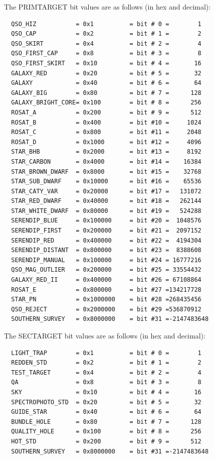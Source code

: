\documentclass[12pt,preprint]{aastex}
\begin{document}
The PRIMTARGET bit values are as follows (in hex and decimal):
\begin{verbatim}
  QSO_HIZ           = 0x1          = bit # 0 =        1
  QSO_CAP           = 0x2          = bit # 1 =        2
  QSO_SKIRT         = 0x4          = bit # 2 =        4
  QSO_FIRST_CAP     = 0x8          = bit # 3 =        8
  QSO_FIRST_SKIRT   = 0x10         = bit # 4 =       16
  GALAXY_RED        = 0x20         = bit # 5 =       32
  GALAXY            = 0x40         = bit # 6 =       64
  GALAXY_BIG        = 0x80         = bit # 7 =      128
  GALAXY_BRIGHT_CORE= 0x100        = bit # 8 =      256
  ROSAT_A           = 0x200        = bit # 9 =      512
  ROSAT_B           = 0x400        = bit #10 =     1024
  ROSAT_C           = 0x800        = bit #11 =     2048
  ROSAT_D           = 0x1000       = bit #12 =     4096
  STAR_BHB          = 0x2000       = bit #13 =     8192
  STAR_CARBON       = 0x4000       = bit #14 =    16384
  STAR_BROWN_DWARF  = 0x8000       = bit #15 =    32768
  STAR_SUB_DWARF    = 0x10000      = bit #16 =    65536
  STAR_CATY_VAR     = 0x20000      = bit #17 =   131072
  STAR_RED_DWARF    = 0x40000      = bit #18 =   262144
  STAR_WHITE_DWARF  = 0x80000      = bit #19 =   524288
  SERENDIP_BLUE     = 0x100000     = bit #20 =  1048576
  SERENDIP_FIRST    = 0x200000     = bit #21 =  2097152
  SERENDIP_RED      = 0x400000     = bit #22 =  4194304
  SERENDIP_DISTANT  = 0x800000     = bit #23 =  8388608
  SERENDIP_MANUAL   = 0x100000     = bit #24 = 16777216
  QSO_MAG_OUTLIER   = 0x200000     = bit #25 = 33554432
  GALAXY_RED_II     = 0x400000     = bit #26 = 67108864
  ROSAT_E           = 0x800000     = bit #27 =134217728
  STAR_PN           = 0x1000000    = bit #28 =268435456
  QSO_REJECT        = 0x2000000    = bit #29 =536870912
  SOUTHERN_SURVEY   = 0x8000000    = bit #31 =-2147483648
\end{verbatim}

The SECTARGET bit values are as follows (in hex and decimal):
\begin{verbatim}
  LIGHT_TRAP        = 0x1          = bit # 0 =        1
  REDDEN_STD        = 0x2          = bit # 1 =        2
  TEST_TARGET       = 0x4          = bit # 2 =        4
  QA                = 0x8          = bit # 3 =        8
  SKY               = 0x10         = bit # 4 =       16
  SPECTROPHOTO_STD  = 0x20         = bit # 5 =       32
  GUIDE_STAR        = 0x40         = bit # 6 =       64
  BUNDLE_HOLE       = 0x80         = bit # 7 =      128
  QUALITY_HOLE      = 0x100        = bit # 8 =      256
  HOT_STD           = 0x200        = bit # 9 =      512
  SOUTHERN_SURVEY   = 0x8000000    = bit #31 =-2147483648
\end{verbatim}
\end{document}
